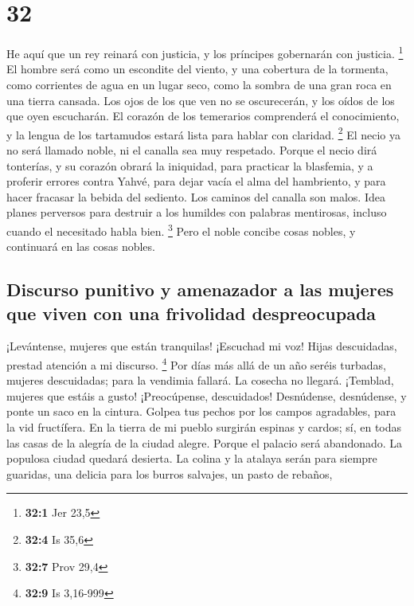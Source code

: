 \hypertarget{section-31}{%
\section{32}\label{section-31}}

 He aquí que un rey reinará con justicia, y los príncipes
gobernarán con justicia. \footnote{\textbf{32:1} Jer 23,5}
 El hombre será como un escondite del viento, y una
cobertura de la tormenta, como corrientes de agua en un lugar seco, como
la sombra de una gran roca en una tierra cansada.  Los
ojos de los que ven no se oscurecerán, y los oídos de los que oyen
escucharán.  El corazón de los temerarios comprenderá el
conocimiento, y la lengua de los tartamudos estará lista para hablar con
claridad. \footnote{\textbf{32:4} Is 35,6}  El necio ya no
será llamado noble, ni el canalla sea muy respetado. 
Porque el necio dirá tonterías, y su corazón obrará la iniquidad, para
practicar la blasfemia, y a proferir errores contra Yahvé, para dejar
vacía el alma del hambriento, y para hacer fracasar la bebida del
sediento.  Los caminos del canalla son malos. Idea planes
perversos para destruir a los humildes con palabras mentirosas, incluso
cuando el necesitado habla bien. \footnote{\textbf{32:7} Prov 29,4}
 Pero el noble concibe cosas nobles, y continuará en las
cosas nobles.

\hypertarget{discurso-punitivo-y-amenazador-a-las-mujeres-que-viven-con-una-frivolidad-despreocupada}{%
\subsection{Discurso punitivo y amenazador a las mujeres que viven con
una frivolidad
despreocupada}\label{discurso-punitivo-y-amenazador-a-las-mujeres-que-viven-con-una-frivolidad-despreocupada}}

 ¡Levántense, mujeres que están tranquilas! ¡Escuchad mi
voz! Hijas descuidadas, prestad atención a mi discurso. \footnote{\textbf{32:9}
  Is 3,16-999}  Por días más allá de un año seréis
turbadas, mujeres descuidadas; para la vendimia fallará. La cosecha no
llegará.  ¡Temblad, mujeres que estáis a gusto!
¡Preocúpense, descuidados! Desnúdense, desnúdense, y ponte un saco en la
cintura.  Golpea tus pechos por los campos agradables,
para la vid fructífera.  En la tierra de mi pueblo
surgirán espinas y cardos; sí, en todas las casas de la alegría de la
ciudad alegre.  Porque el palacio será abandonado. La
populosa ciudad quedará desierta. La colina y la atalaya serán para
siempre guaridas, una delicia para los burros salvajes, un pasto de
rebaños,

